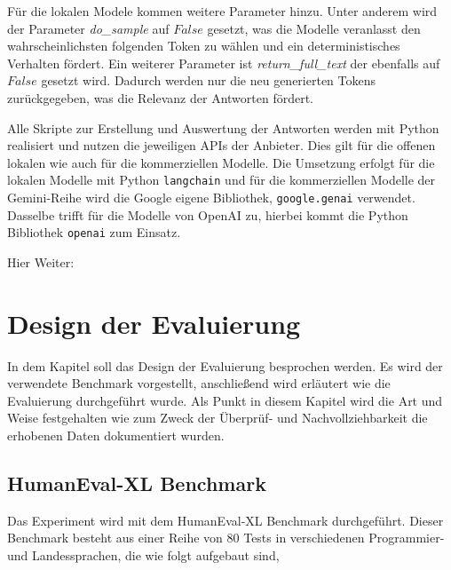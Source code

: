 Für die lokalen Modele kommen weitere Parameter hinzu. Unter anderem wird der Parameter \textit{do\_sample} auf $False$ gesetzt, was die Modelle veranlasst den wahrscheinlichsten folgenden Token zu wählen und ein deterministisches Verhalten fördert. Ein weiterer Parameter ist \textit{return\_full\_text} der ebenfalls auf $False$ gesetzt wird. Dadurch werden nur die neu generierten Tokens zurückgegeben, was die Relevanz der Antworten fördert.\vspace{0.2cm}

Alle Skripte zur Erstellung und Auswertung der Antworten werden mit Python realisiert und nutzen die jeweiligen APIs der Anbieter. Dies gilt für die offenen lokalen wie auch für die kommerziellen Modelle. Die Umsetzung erfolgt für die lokalen Modelle mit Python \texttt{langchain} und für die kommerziellen Modelle der Gemini-Reihe wird die Google eigene Bibliothek, \texttt{google.genai} verwendet. Dasselbe trifft für die Modelle von OpenAI zu, hierbei kommt die Python Bibliothek \texttt{openai} zum Einsatz.


Hier Weiter:

\section{Design der Evaluierung}
In dem Kapitel soll das Design der Evaluierung besprochen werden. Es wird der verwendete Benchmark vorgestellt, anschließend wird erläutert wie die Evaluierung durchgeführt wurde. Als Punkt in diesem Kapitel wird die Art und Weise festgehalten wie zum Zweck der Überprüf- und Nachvollziehbarkeit die erhobenen Daten dokumentiert wurden.


\subsection{HumanEval-XL Benchmark}\label{subsec:structor_of_humaneval_xl}
Das Experiment wird mit dem HumanEval-XL Benchmark durchgeführt. Dieser Benchmark besteht aus einer Reihe von 80 Tests in verschiedenen Programmier- und Landessprachen, die wie folgt aufgebaut sind,

